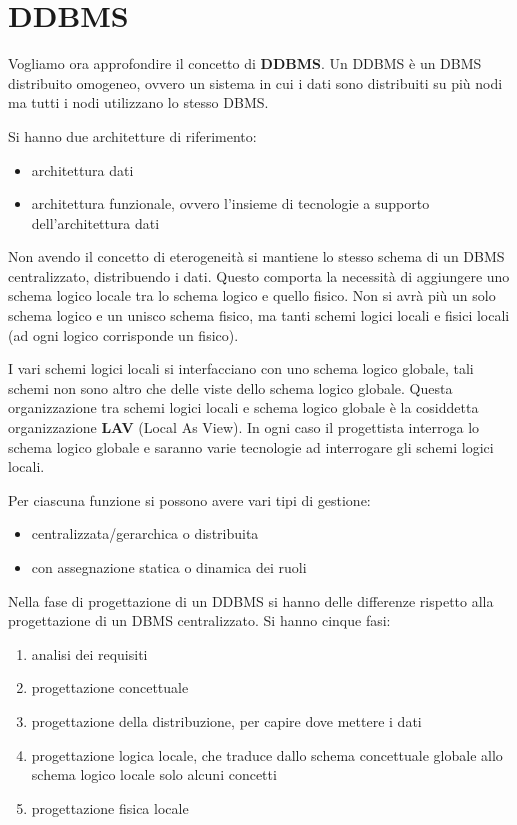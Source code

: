 \section{DDBMS}
Vogliamo ora approfondire il concetto di \textbf{DDBMS}. Un DDBMS è un DBMS
distribuito omogeneo, ovvero un sistema in cui i dati sono distribuiti su più
nodi ma tutti i nodi utilizzano lo stesso DBMS.

Si hanno due architetture di riferimento:
\begin{itemize}
    \item architettura dati
    \item architettura funzionale, ovvero l'insieme di tecnologie a supporto
          dell'architettura dati
\end{itemize}

Non avendo il concetto di eterogeneità si mantiene lo stesso schema di un DBMS
centralizzato, distribuendo i dati. Questo comporta la necessità di aggiungere
uno schema logico locale tra lo schema logico e quello fisico. Non si avrà più
un solo schema logico e un unisco schema fisico, ma tanti schemi logici locali e
fisici locali (ad ogni logico corrisponde un fisico).

I vari schemi logici locali si interfacciano con uno schema logico globale,
tali schemi non sono altro che delle viste dello schema logico globale. Questa
organizzazione tra schemi logici locali e schema logico globale è la cosiddetta
organizzazione \textbf{LAV} (Local As View). In ogni caso il progettista interroga
lo schema logico globale e saranno varie tecnologie ad interrogare gli schemi
logici locali.

Per ciascuna funzione si possono avere vari tipi di gestione:
\begin{itemize}
    \item centralizzata/gerarchica o distribuita
    \item con assegnazione statica o dinamica dei ruoli
\end{itemize}
Nella fase di progettazione di un DDBMS si hanno delle differenze rispetto alla
progettazione di un DBMS centralizzato. Si hanno cinque fasi:
\begin{enumerate}
    \item analisi dei requisiti
    \item progettazione concettuale
    \item progettazione della distribuzione, per capire dove mettere i dati
    \item progettazione logica locale, che traduce dallo schema concettuale
          globale allo schema logico locale solo alcuni concetti
    \item progettazione fisica locale
\end{enumerate}

